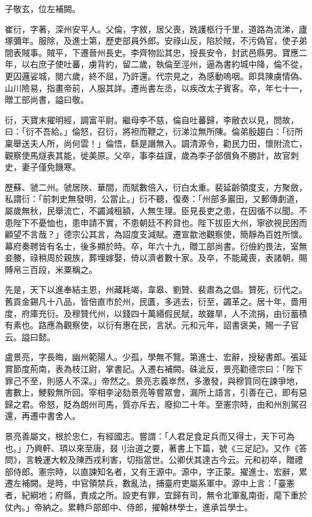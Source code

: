 \begin{pinyinscope}
 子敬玄，位左補闕。



 崔衍，字著，深州安平人。父倫，字敘，居父喪，跣護柩行千里，道路為流涕，廬塚彌年。服除，及進士第，歷吏部員外郎。安祿山反，陷於賊，不污偽官，使子弟間表賊事。賊平，下遷晉州長史。李齊物訟其忠，授長安令，封武邑縣男。寶應二年，以右庶子使吐蕃，虜背約，留二歲，執倫至涇州，逼為書約城中降，倫不從，更囚邏娑城，閱六歲，終不屈，乃許還。代宗見之，為感動嗚咽。即具陳虜情偽、山川險易，指畫帝前，人服其詳。遷尚書左丞，以疾改太子賓客。卒，年七十一，贈工部尚書，謚曰敬。



 衍，天寶末擢明經，調富平尉。繼母李不慈，倫自吐蕃歸，李敝衣以見，問故，曰：「衍不吾給。」倫怒，召衍，將袒而鞭之，衍涕泣無所陳。倫弟殷趨白：「衍所稟舉送夫人所，尚何雲！」倫悟，繇是譖無入。調清源令，勸民力田，懷附流亡，觀察使馬燧表其能，徙美原。父卒，事李益謹，歲為李子郃償負不勝計，故官刺史，妻子僅免饑寒。



 歷蘇、虢二州。虢居陜、華間，而賦數倍入，衍白太重。裴延齡領度支，方聚斂，私謂衍：「前刺史無發明，公當止。」衍不聽，復奏：「州部多巖田，又郵傳劇道，屬歲無秋，民舉流亡，不蠲減租額，人無生理。臣見長吏之患，在因循不以聞。不患陛下不憂恤也，患申請不實，不患朝廷不矜貸也。陛下拔臣大州，寧欲視民困而顧望不言哉？」德宗公其言，為詔度支減賦。遷宣歙池觀察使，簡靜為百姓所懷。幕府奏聘皆有名士，後多顯於時。卒，年六十九，贈工部尚書。衍儉約畏法，室無妾媵，祿稍周於親族，葬埋嫁娶，倚以濟者數十家。及卒，不能蕆喪，表諸朝，賜賻帛三百段，米粟稱之。



 先是，天下以進奉結主恩，州藏耗竭，韋皋、劉贊、裴肅為之倡。贊死，衍代之。舊貢金錫凡十八品，皆倍直市於州，民匱，多逃去，衍至，蠲革之。居十年，嗇用度，府庫充衍。及穆贊代州，以錢四十萬緡假民賦，故雖旱，人不流捐，由衍蓄積有素也。路應為觀察使，以衍有惠在民，言狀。元和元年，詔書褒美，賜一子官云。謚曰懿。



 盧景亮，字長晦，幽州範陽人。少孤，學無不覽。第進士、宏辭，授秘書郎。張延賞節度荊南，表為枝江尉，掌書記。入遷右補闕。硃泚反，景亮勸德宗曰：「陛下罪己不至，則感人不深。」帝然之。景亮志義崒然，多激發，與穆質同在諫爭地，書數上，鯁毅無所回。宰相李泌劾景亮等嘗眾會，漏所上語言，引善在己，即有惡歸之君。帝怒，貶為朗州司馬，質亦斥去，廢抑二十年。至憲宗時，由和州別駕召還，再遷中書舍人。



 景亮善屬文，根於忠仁，有經國志。嘗謂：「人君足食足兵而又得士，天下可為也。」乃興軒、頊以來至唐，叕刂治道之要，著書上下篇，號《三足記》。又作《答問》，言輓運大較及陳西戎利害，切指當世。公卿伏其達古今云。元和初卒，贈禮部侍郎。憲宗時，以直諫知名者，又有王源中。源中，字正蒙。擢進士、宏辭，累遷左補闕。是時，中官領禁兵，數亂法，捕臺府吏屬系軍中。源中上言：「臺憲者，紀綱地；府縣，責成之所。設吏有罪，宜歸有司，無令北軍亂南衙，麾下重於仗內。」帝納之。累轉戶部郎中、侍郎，擢翰林學士，進承旨學士。




\end{pinyinscope}
